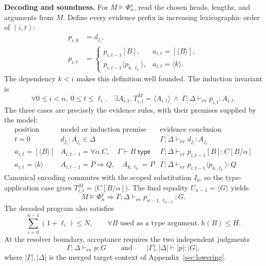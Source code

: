 \documentclass[10pt,a4paper]{article}
\newcommand{\wf}[1]{\Gamma\vdash #1\;\mathsf{type}}
\newcommand{\Pj}[2]{\Gamma;\Delta\vdash_{\mathrm{ev}} #1:#2}
\newcommand{\iarg}[1]{\langle#1\rangle}
\newcommand{\erase}[1]{\lvert #1\rvert}
\begin{document}
\newpage
\textbf{Decoding and soundness.}
For $M\models\Phi_n^\star$, read the chosen heads, lengths, and arguments from $M$.
Define every evidence prefix in increasing lexicographic order of $(i,t)$:
\[
\begin{aligned}
 p_{i,0}&=d_{j_i},\\
 p_{i,t}&=
 \begin{cases}
  p_{i,t-1}[B],&a_{i,t}=[\langle B\rangle],\\
  p_{i,t-1}\iarg{p_{k,\ell_k}},&a_{i,t}=\iarg{k}.
 \end{cases}
\end{aligned}
\]
The dependency $k<i$ makes this definition well founded. The induction invariant is
\[
 \boxed{\forall 0\le i<n,\ 0\le t\le\ell_i.\quad
  \exists A_{i,t}.\ T_{i,t}^{M}=\langle A_{i,t}\rangle\
  \land\ \Pj{p_{i,t}}{A_{i,t}}.}
\]
The three cases are precisely the evidence rules, with their premises supplied
by the model:
\[
\begin{array}{c|c|c}
 \text{position} & \text{model or induction premise} & \text{evidence conclusion}\\ \hline
 t=0 & d_{j_i}:A_{j_i}\in\Delta
   & \Pj{d_{j_i}}{A_{j_i}}\\[4pt]
 a_{i,t}=[\langle B\rangle]
   & A_{i,t-1}=\forall\alpha.C,\quad\wf B
   & \Pj{p_{i,t-1}[B]}{C[B/\alpha]}\\[4pt]
 a_{i,t}=\iarg{k}
   & A_{i,t-1}=P\Rightarrow Q,\quad A_{k,\ell_k}=P
   & \Pj{p_{i,t-1}\iarg{p_{k,\ell_k}}}Q
\end{array}
\]
Canonical encoding commutes with the scoped substitution $I_0$, so the type-application
case gives $T_{i,t}^{M}=\langle C[B/\alpha]\rangle$.
The final equality $U_{n-1}=\langle G\rangle$ yields
\[
 \boxed{M\models\Phi_n^\star
       \Longrightarrow \Pj{p_{n-1,\ell_{n-1}}}G.}
\]
The decoded program also satisfies
\[
 \sum_{i=0}^{n-1}(1+\ell_i)\le N,\qquad
 \forall B\text{ used as a type argument}.\ h(B)\le H.
\]
At the resolver boundary, acceptance requires the two independent judgments
\[
 \Pj p G
 \qquad\text{and}\qquad
 \erase\Gamma,\erase\Delta\vdash\erase p:\erase G,
\]
where $\erase\Gamma,\erase\Delta$ is the merged target context of Appendix~\ref{sec:lowering}.
\end{document}
